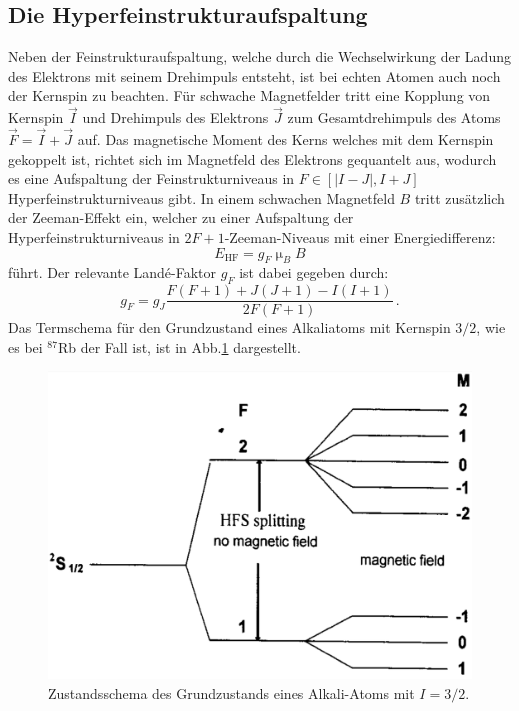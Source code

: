 \subsection{Die Hyperfeinstrukturaufspaltung}
Neben der Feinstrukturaufspaltung, welche durch die Wechselwirkung der Ladung des Elektrons mit seinem Drehimpuls entsteht, ist bei echten Atomen auch noch der Kernspin zu beachten. Für schwache Magnetfelder tritt eine Kopplung von Kernspin $\vec{I}$ und Drehimpuls des Elektrons $\vec{J}$ zum Gesamtdrehimpuls des Atoms $\vec{F}=\vec{I}+\vec{J}$ auf. Das magnetische Moment des Kerns welches mit dem Kernspin gekoppelt ist, richtet sich im Magnetfeld des Elektrons gequantelt aus, wodurch es
eine Aufspaltung der Feinstrukturniveaus in $F \in [|I-J|,I+J]$ Hyperfeinstrukturniveaus gibt.
In einem schwachen Magnetfeld $B$ tritt zusätzlich der Zeeman-Effekt ein, welcher zu einer Aufspaltung der Hyperfeinstrukturniveaus in $2F+1$-Zeeman-Niveaus mit einer Energiedifferenz:
\begin{equation}
  E_{\text{HF}}=g_F\upmu_BB
\end{equation}
führt. Der relevante Landé-Faktor $g_F$ ist dabei gegeben durch:
\begin{equation}
  g_F=g_J\frac{F(F+1)+J(J+1)-I(I+1)}{2F(F+1)}\,.
\end{equation}
Das Termschema für den Grundzustand eines Alkaliatoms mit Kernspin $3/2$, wie es bei $^{87}$Rb der Fall ist, ist in Abb.\ref{Hyperfein} dargestellt.
\begin{figure}
  \centering
  \includegraphics[scale=0.4]{Bilder/Hyperfein}
  \caption{Zustandsschema des Grundzustands eines Alkali-Atoms mit $I=3/2$\cite{Black}.}
  \label{Hyperfein}
\end{figure}
